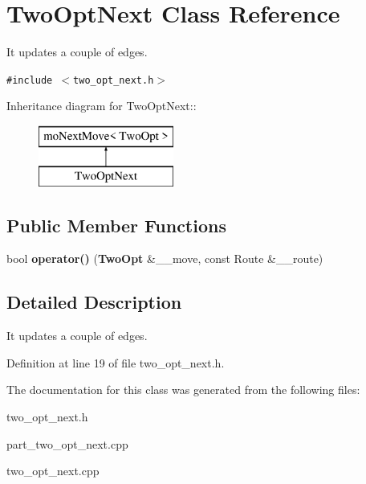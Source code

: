 \section{TwoOptNext Class Reference}
\label{class_two_opt_next}
It updates a couple of edges.  


{\tt \#include $<$two\_\-opt\_\-next.h$>$}

Inheritance diagram for TwoOptNext::\begin{figure}[H]
\begin{center}
\leavevmode
\includegraphics[height=2cm]{class_two_opt_next}
\end{center}
\end{figure}
\subsection*{Public Member Functions}
\begin{CompactItemize}
\item 
bool {\bf operator()} ({\bf TwoOpt} \&\_\-\_\-move, const Route \&\_\-\_\-route)\label{class_two_opt_next_baf229b2e056f39ab971cf2ac66a833e}

\end{CompactItemize}


\subsection{Detailed Description}
It updates a couple of edges. 



Definition at line 19 of file two\_\-opt\_\-next.h.

The documentation for this class was generated from the following files:\begin{CompactItemize}
\item 
two\_\-opt\_\-next.h\item 
part\_\-two\_\-opt\_\-next.cpp\item 
two\_\-opt\_\-next.cpp\end{CompactItemize}
